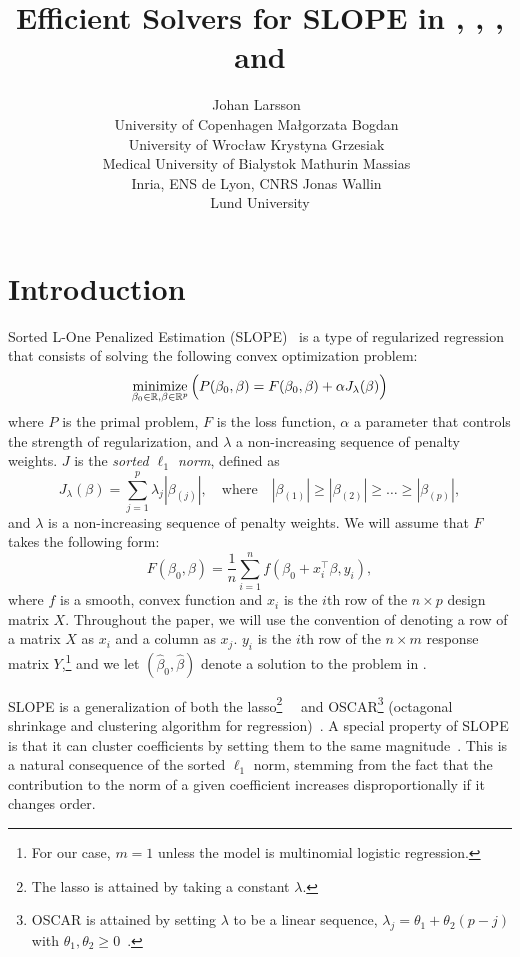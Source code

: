 \documentclass[article]{jss}
\author{
  Johan Larsson~\orcidlink{0000-0002-4029-5945}\\University of Copenhagen
  \And
  Ma\l{}gorzata Bogdan~\orcidlink{0000-0001-6355-8261}\\University of Wroc\l{}aw
  \And
  Krystyna Grzesiak~\orcidlink{0000-0003-2581-7722}\\Medical University of Bialystok
  \AND
  Mathurin Massias~\orcidlink{0000-0002-8950-0356}\\Inria, ENS de Lyon, CNRS
  \And
  Jonas Wallin~\orcidlink{0000-0003-0381-6593}\\Lund University
}
\title{Efficient Solvers for SLOPE in \proglang{R}, \proglang{Python}, \proglang{Julia}, and \proglang{C++}}
\let\Cref\crtCref
\begin{document}
\section{Introduction}

Sorted L-One Penalized Estimation
(SLOPE)~\citep{bogdan2013,zeng2014,bogdan2015} is a type of regularized
regression that consists of solving the following convex optimization problem:
\begin{equation}
  \label{eq:slope}
  \operatorname*{minimize}_{\beta_0 \in \mathbb{R},\beta \in \mathbb{R}^p}
  \Big(
  P(\beta_0,\beta)
  = F(\beta_0, \beta) + \alpha J_{\lambda}(\beta)
  \Big)
\end{equation}
where \(P\) is the primal problem, \(F\) is the loss function, \(\alpha\) a parameter
that controls the strength of regularization, and \(\lambda\) a non-increasing sequence of penalty weights. \(J\) is the
\emph{sorted $\ell_1$ norm}, defined as
\begin{equation}
  \label{eq:sl1}
  J_{\lambda}(\beta) = \sum_{j=1}^p \lambda_j |\beta_{(j)}|, \quad
  \text{where}\quad |\beta_{(1)}| \geq |\beta_{(2)}| \geq \ldots \geq
  |\beta_{(p)}|,
\end{equation}
and \(\lambda\) is a non-increasing sequence of penalty weights. We will
assume that \(F\) takes the following form:
\[
  F(\beta_0, \beta) = \frac{1}{n} \sum_{i=1}^n f(\beta_0 + x_i^\intercal \beta, y_i),
\]
where \(f\) is a smooth, convex function and \(x_i\) is the \(i\)th row of the
\(n \times p\) design matrix \(X\). Throughout the paper, we will use the
convention of denoting a row of a matrix \(X\) as \(x_i\) and a column as
\(x_j\). \(y_i\) is the \(i\)th row of the \(n \times m\) response matrix
\(Y\),\footnote{For our case, \(m = 1\) unless the model is multinomial
  logistic regression.}
and we let \((\hat{\beta}_0,
\hat{\beta})\) denote a solution to the problem in \Cref{eq:slope}.

SLOPE is a generalization of both the lasso\footnote{The lasso is attained by
  taking a constant
  \(\lambda\).}~~\citep{santosa1986,donoho1994,donoho1995,tibshirani1996} and
OSCAR\footnote{OSCAR is attained by setting \(\lambda\) to be a linear
  sequence, \(\lambda_j = \theta_1 + \theta_2(p - j)\) with \(\theta_1,
  \theta_2 \geq 0\)~\citep{figueiredo2014}.} (octagonal shrinkage and clustering
algorithm for regression)~\citep{bondell2008}.
A special property of SLOPE is that it can cluster coefficients by
setting them to the same magnitude~\citep{figueiredo2016,bogdan2022}. This is a natural
consequence of the sorted \(\ell_1\) norm, stemming from the fact that
the contribution to the norm of a given coefficient increases disproportionally if it
changes order.
\end{document}
